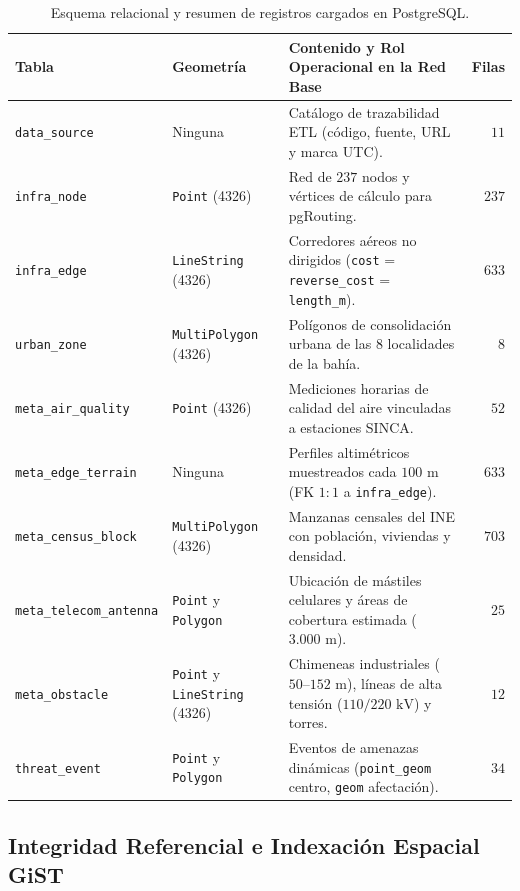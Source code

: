 \documentclass[letterpaper,12pt]{article}
\begin{document}
\begin{table}[H]
\centering
\small
\caption{Esquema relacional y resumen de registros cargados en PostgreSQL.}
\label{tab:bd}
\begin{tabularx}{\linewidth}{llXr}
\toprule
\textbf{Tabla} & \textbf{Geometría} & \textbf{Contenido y Rol Operacional en la Red Base} & \textbf{Filas} \\
\midrule
\texttt{data\_source} & Ninguna & Catálogo de trazabilidad ETL (código, fuente, URL y marca UTC). & $11$ \\
\texttt{infra\_node} & \texttt{Point} (4326) & Red de $237$ nodos y vértices de cálculo para pgRouting. & $237$ \\
\texttt{infra\_edge} & \texttt{LineString} (4326) & Corredores aéreos no dirigidos (\texttt{cost} = \texttt{reverse\_cost} = \texttt{length\_m}). & $633$ \\
\texttt{urban\_zone} & \texttt{MultiPolygon} (4326) & Polígonos de consolidación urbana de las $8$ localidades de la bahía. & $8$ \\
\texttt{meta\_air\_quality} & \texttt{Point} (4326) & Mediciones horarias de calidad del aire vinculadas a estaciones SINCA. & $52$ \\
\texttt{meta\_edge\_terrain} & Ninguna & Perfiles altimétricos muestreados cada $100\text{ m}$ (FK $1:1$ a \texttt{infra\_edge}). & $633$ \\
\texttt{meta\_census\_block} & \texttt{MultiPolygon} (4326) & Manzanas censales del INE con población, viviendas y densidad. & $703$ \\
\texttt{meta\_telecom\_antenna} & \texttt{Point} y \texttt{Polygon} & Ubicación de mástiles celulares y áreas de cobertura estimada ($3.000\text{ m}$). & $25$ \\
\texttt{meta\_obstacle} & \texttt{Point} y \texttt{LineString} (4326) & Chimeneas industriales ($50\text{--}152\text{ m}$), líneas de alta tensión ($110/220\text{ kV}$) y torres. & $12$ \\
\texttt{threat\_event} & \texttt{Point} y \texttt{Polygon} & Eventos de amenazas dinámicas (\texttt{point\_geom} centro, \texttt{geom} afectación). & $34$ \\
\bottomrule
\end{tabularx}
\end{table}

\subsection{Integridad Referencial e Indexación Espacial GiST}
\label{subsec:bd_integridad}
\end{document}

